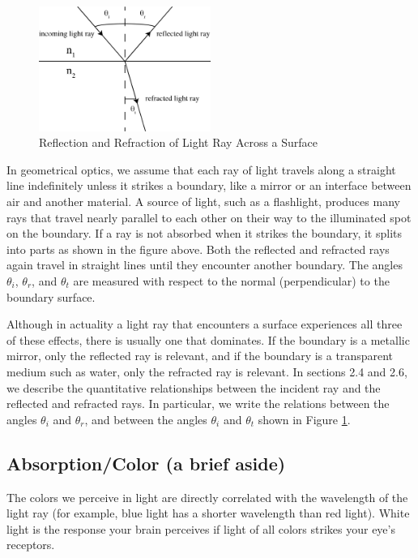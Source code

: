 \begin{figure}[h]
    \begin{center}
        \includegraphics[width=0.5\textwidth]{./Exp6/pic/basicsnelllaw.png}
    \end{center}
    \caption{Reflection and Refraction of Light Ray Across a Surface}
    \label{fig:rayref}
\end{figure}

In geometrical optics, we assume that each ray of light travels along a straight line indefinitely unless it strikes a boundary, like a mirror or an interface between air and another material. A source of light, such as a flashlight, produces many rays that travel nearly parallel to each other on their way to the illuminated spot on the boundary. If a ray is not absorbed when it strikes the boundary, it splits into parts as shown in the figure above. Both the reflected and refracted rays again travel in straight lines until they encounter another boundary. The angles $\theta_{i}$, $\theta_{r}$, and $\theta_{t}$ are measured with respect to the normal (perpendicular) to the boundary surface.\myskip

Although in actuality a light ray that encounters a surface experiences all three of these effects, there is usually one that dominates. If the boundary is a metallic mirror, only the reflected ray is relevant, and if the boundary is a transparent medium such as water, only the refracted ray is relevant. In sections 2.4 and 2.6, we describe the quantitative relationships between the incident ray and the reflected and refracted rays. In particular, we write the relations between the angles $\theta_{i}$ and $\theta_{r}$, and between the angles $\theta_{i}$ and $\theta_{t}$ shown in Figure \ref{fig:rayref}.

\subsection{Absorption/Color (a brief aside)}

The colors we perceive in light are directly correlated with the wavelength of the light ray (for example, blue light has a shorter wavelength than red light). White light is the response your brain perceives if light of all colors strikes your eye's receptors.  \myskip


